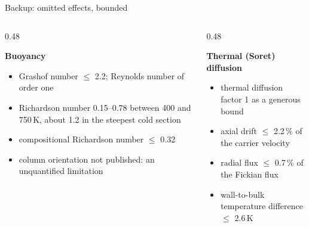 \documentclass[aspectratio=169,10pt]{beamer}
\newcommand{\subhead}[1]{{\normalsize\bfseries\color{PSIblack}#1\par}\vspace{0.15em}}
\begin{document}
\begin{frame}[t]{Backup: omitted effects, bounded}
  \begin{columns}[T,onlytextwidth]
    \begin{column}{0.48\textwidth}
      \subhead{Buoyancy}
      \begin{itemize}
        \item Grashof number $\le$ 2.2; Reynolds number of order one
        \item Richardson number 0.15--0.78 between 400 and 750\,K, about 1.2 in the steepest cold section
        \item compositional Richardson number $\le$ 0.32
        \item column orientation not published: an unquantified limitation
      \end{itemize}
    \end{column}
    \begin{column}{0.48\textwidth}
      \subhead{Thermal (Soret) diffusion}
      \begin{itemize}
        \item thermal diffusion factor 1 as a generous bound
        \item axial drift $\le$ 2.2\,\% of the carrier velocity
        \item radial flux $\le$ 0.7\,\% of the Fickian flux
        \item wall-to-bulk temperature difference $\le$ 2.6\,K
      \end{itemize}
    \end{column}
  \end{columns}
\end{frame}
\end{document}
